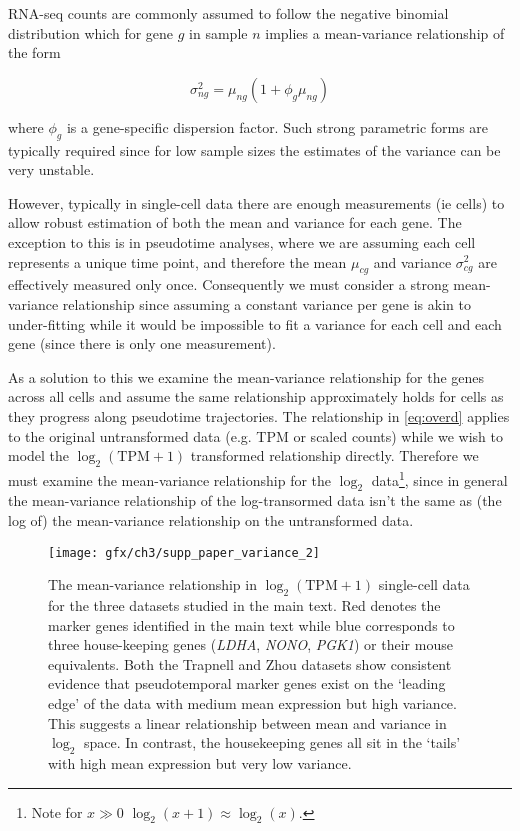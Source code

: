 RNA-seq counts are commonly assumed to follow the negative binomial distribution 
\cite{Anders2010,Love2014-lx,Robinson2010-rj}
which for gene $g$ in sample $n$ implies a mean-variance relationship of the form

\begin{equation} \label{eq:overd}
\sigma_{ng}^2 = \mu_{ng}(1 + \phi_g \mu_{ng})
\end{equation}

where $\phi_g$ is a gene-specific dispersion factor. Such strong parametric forms are typically required since for low sample sizes the estimates of the variance can be very unstable. %

However, typically in single-cell data there are enough measurements (ie cells) to allow robust estimation of both the mean and variance for each gene\cite{Finak2015-iy}. The exception to this is in pseudotime analyses, where we are assuming each cell represents a unique time point, and therefore the mean $\mu_{cg}$ and variance $\sigma^2_{cg}$ are effectively measured only once. Consequently we must consider a strong mean-variance relationship since assuming a constant variance per gene is akin to under-fitting while it would be impossible to fit a variance for each cell and each gene (since there is only one measurement).

As a solution to this we examine the mean-variance relationship for the genes across all cells and assume the same relationship approximately holds for cells as they progress along pseudotime trajectories. The relationship in \ref{eq:overd} applies to the original untransformed data (e.g. TPM or scaled counts) while we wish to model the $\log_2(\text{TPM} + 1)$ transformed relationship directly. Therefore we must examine the mean-variance relationship for the $\log_2$ data\footnote{Note for $x \gg 0$ $\log_2(x+1) \approx \log_2(x)$.}, since in general the mean-variance relationship of the log-transormed data isn't the same as (the log of) the mean-variance relationship on the untransformed data.

\begin{figure}
\centering
 \texttt{[image: gfx/ch3/supp\_paper\_variance\_2]}
 \caption{The mean-variance relationship in $\log_2(\text{TPM} + 1)$ single-cell data for the three datasets studied in the main text. Red denotes the marker genes identified in the main text while blue corresponds to three house-keeping genes (\emph{LDHA}, \emph{NONO}, \emph{PGK1}) or their mouse equivalents. Both the Trapnell and Zhou datasets show consistent evidence that pseudotemporal marker genes exist on the `leading edge' of the data with medium mean expression but high variance. This suggests a linear relationship between mean and variance in $\log_2$ space. In contrast, the housekeeping genes all sit in the `tails' with high mean expression but very low variance.} \label{fig:variance}
 \end{figure}

